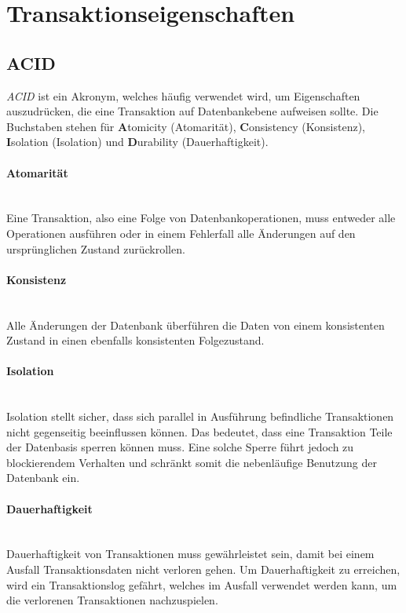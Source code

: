 \section{Transaktionseigenschaften}

\subsection{ACID}
\textit{ACID} ist ein Akronym, welches häufig verwendet wird, um Eigenschaften auszudrücken, die eine Transaktion auf Datenbankebene aufweisen sollte. Die Buchstaben stehen für \textbf{A}tomicity (Atomarität), \textbf{C}onsistency (Konsistenz), \textbf{I}solation (Isolation) und \textbf{D}urability (Dauerhaftigkeit)\cite{Dey.}. 

\paragraph*{Atomarität} \mbox{} \\
Eine Transaktion, also eine Folge von Datenbankoperationen, muss entweder alle Operationen ausführen oder in einem Fehlerfall alle Änderungen auf den ursprünglichen Zustand zurückrollen. 

\paragraph*{Konsistenz} \mbox{} \\
Alle Änderungen der Datenbank überführen die Daten von einem konsistenten Zustand in einen ebenfalls konsistenten Folgezustand. 

\paragraph*{Isolation} \mbox{} \\
Isolation stellt sicher, dass sich parallel in Ausführung befindliche Transaktionen nicht gegenseitig beeinflussen können. Das bedeutet, dass eine Transaktion Teile der Datenbasis sperren können muss. Eine solche Sperre führt jedoch zu blockierendem Verhalten und schränkt somit die nebenläufige Benutzung der Datenbank ein. 

\paragraph*{Dauerhaftigkeit} \mbox{} \\
Dauerhaftigkeit von Transaktionen muss gewährleistet sein, damit bei einem Ausfall Transaktionsdaten nicht verloren gehen. Um Dauerhaftigkeit zu erreichen, wird ein Transaktionslog gefährt, welches im Ausfall verwendet werden kann, um die verlorenen Transaktionen nachzuspielen. 

